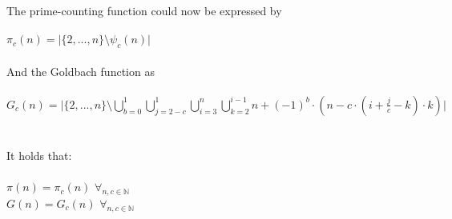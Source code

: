 \documentclass[12pt,ngerman]{article}
\theoremstyle{definition}
\begin{document}
The prime-counting function could now be expressed by\\\\
$\pi_c(n) = \vert \{2,...,n\} \setminus \psi_c(n) \vert$\\\\
And the Goldbach function as\\\\
$G_c(n) = \vert \{2,...,n\} \setminus \bigcup\limits_{b = 0}^{1} \bigcup\limits_{j = 2-c}^{1} \bigcup\limits_{i = 3}^{n} \bigcup\limits_{k = 2}^{i-1} n + (-1)^b \cdot (n - c \cdot (i + \frac{j}{c} - k) \cdot k) \vert$\\\\\\
It holds that:\\\\
$\pi(n) = \pi_c(n)$ $\forall_{n,c \in \mathbb{N}}$\\
$G(n) = G_c(n)$ $\forall_{n,c \in \mathbb{N}}$
\end{document}
